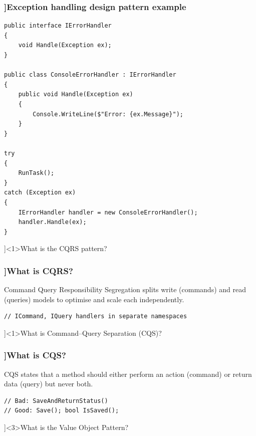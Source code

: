 \begin{frame}[fragile]
  \frametitle{\AnswerTitle[\CategoryBadge[OOPColor!20]{Design Patterns}]{Exception handling design pattern example}}

  \begin{verbatim}
public interface IErrorHandler
{
    void Handle(Exception ex);
}

public class ConsoleErrorHandler : IErrorHandler
{
    public void Handle(Exception ex)
    {
        Console.WriteLine($"Error: {ex.Message}");
    }
}

try
{
    RunTask();
}
catch (Exception ex)
{
    IErrorHandler handler = new ConsoleErrorHandler();
    handler.Handle(ex);
}
  \end{verbatim}
\end{frame}

\QuestionSlide[\CategoryBadge[OOPColor!20]{Design Patterns}]<1>{What is the CQRS pattern?}

\begin{frame}[fragile]
  \frametitle{\AnswerTitle[\CategoryBadge[OOPColor!20]{Design Patterns}]{What is CQRS?}}

  {\footnotesize
  Command Query Responsibility Segregation splits write (commands) and read (queries) models to optimise and scale each independently.
  }

  \begin{verbatim}
// ICommand, IQuery handlers in separate namespaces
  \end{verbatim}
\end{frame}

\QuestionSlide[\CategoryBadge[OOPColor!20]{Design Patterns}]<1>{What is Command–Query Separation (CQS)?}

\begin{frame}[fragile]
  \frametitle{\AnswerTitle[\CategoryBadge[OOPColor!20]{Design Patterns}]{What is CQS?}}

  {\footnotesize
  CQS states that a method should either perform an action (command) or return data (query) but never both.
  }

  \begin{verbatim}
// Bad: SaveAndReturnStatus()
// Good: Save(); bool IsSaved();
  \end{verbatim}
\end{frame}

\QuestionSlide[\CategoryBadge[OOPColor!20]{Design Patterns}]<3>{What is the Value Object Pattern?}

